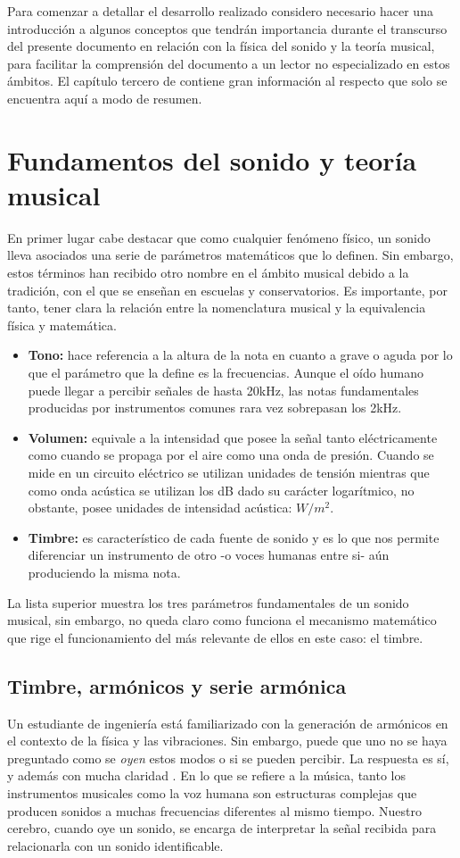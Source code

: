 Para comenzar a detallar el desarrollo realizado considero necesario hacer una introducción a algunos conceptos que tendrán importancia durante el transcurso del presente documento en relación con la física del sonido y la teoría musical, para facilitar la comprensión del documento a un lector no especializado en estos ámbitos. El capítulo tercero de \cite{Instinto} contiene gran información al respecto que solo se encuentra aquí a modo de resumen. 

\section{Fundamentos del sonido y teoría musical}
En primer lugar cabe destacar que como cualquier fenómeno físico, un sonido lleva asociados una serie de parámetros matemáticos que lo definen. Sin embargo, estos términos han recibido otro nombre en el ámbito musical debido a la tradición, con el que se enseñan en escuelas y conservatorios. Es importante, por tanto, tener clara la relación entre la nomenclatura musical y la equivalencia física y matemática.
\begin{itemize}
\item \textbf{Tono:} hace referencia a la altura de la nota en cuanto a grave o aguda por lo que el parámetro que la define es la frecuencias. Aunque el oído humano puede llegar a percibir señales de hasta 20kHz, las notas fundamentales producidas por instrumentos comunes rara vez sobrepasan los 2kHz.
\item \textbf{Volumen:} equivale a la intensidad que posee la señal tanto eléctricamente como cuando se propaga por el aire como una onda de presión. Cuando se mide en un circuito eléctrico se utilizan unidades de tensión mientras que como onda acústica se utilizan los dB dado su carácter logarítmico, no obstante, posee unidades de intensidad acústica: $W/m^{2}$.
\item\textbf{Timbre:} es característico de cada fuente de sonido y es lo que nos permite diferenciar un instrumento de otro -o voces humanas entre si- aún produciendo la misma nota.
\end{itemize}

La lista superior muestra los tres parámetros fundamentales de un sonido musical, sin embargo, no queda claro como funciona el mecanismo matemático que rige el funcionamiento del más relevante de ellos en este caso: el timbre.

\subsection{Timbre, armónicos y serie armónica}
Un estudiante de ingeniería está familiarizado con la generación de armónicos en el contexto de la física y las vibraciones. Sin embargo, puede que uno no se haya preguntado como se \emph{oyen} estos modos o si se pueden percibir. La respuesta es sí, y además con mucha claridad \cite{arm_wood}. En lo que se refiere a la música, tanto los instrumentos musicales como la voz humana son estructuras complejas que producen sonidos a muchas frecuencias diferentes al mismo tiempo. Nuestro cerebro, cuando oye un sonido, se encarga de interpretar la señal recibida para relacionarla con un sonido identificable. 

